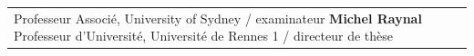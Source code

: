 \begin{titlepage}
\begin{center}
\begin{minipage}{\glarg}
\begin{tabular}{p{7cm}p{10cm}}
\begin{minipage}{\plarg}
{ Professeur Associ{\'e}, University of Sydney \!/\! examinateur\vspace{1.0mm}\newline}
{\Large\bf Michel Raynal \vspace{0mm}\newline}
{ Professeur d'Universit{\'e}, Universit{\'e} de Rennes 1 \!/\! directeur de th\`ese\vspace{-10mm}\newline}



\end{minipage}
\end{tabular}

\end{minipage}
\end{center}
\end{titlepage}

